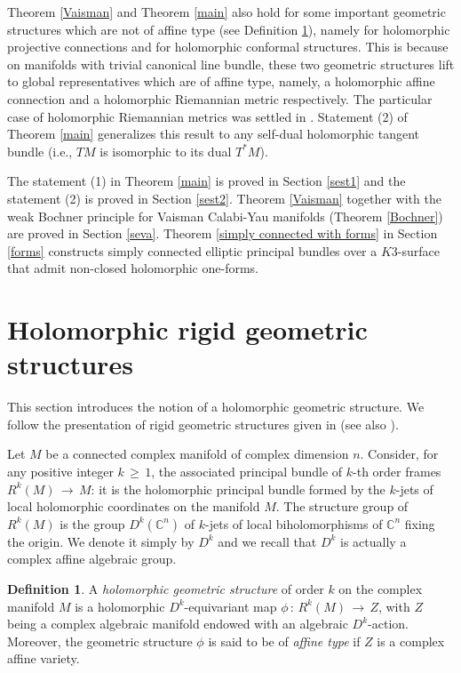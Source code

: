 \documentclass[12pt,reqno]{amsart}
\theoremstyle{definition}
\newtheorem{definition}[theorem]{Definition}
\numberwithin{equation}{section}
\begin{document}
Theorem \ref{Vaisman} and Theorem \ref{main} also hold for some important geometric structures which are 
not of affine type (see Definition \ref{def}), namely for holomorphic projective connections and for 
holomorphic conformal structures. This is because on manifolds with trivial canonical line bundle, these 
two geometric structures lift to global representatives which are of affine type, namely, a holomorphic 
affine connection and a holomorphic Riemannian metric respectively. The particular case of holomorphic 
Riemannian metrics was settled in \cite{BD3}. Statement (2) of Theorem \ref{main} generalizes this result 
to any self-dual holomorphic tangent bundle (i.e., $TM$ is isomorphic to its dual $T^*M$).

The statement (1) in Theorem \ref{main} is proved in Section \ref{sest1} and the statement (2) is proved in 
Section \ref{sest2}. Theorem \ref{Vaisman} together with the weak Bochner principle for Vaisman Calabi-Yau 
manifolds (Theorem \ref{Bochner}) are proved in Section \ref{seva}. Theorem \ref{simply connected with 
forms} in Section \ref{forms} constructs simply connected elliptic principal bundles over a $K3$-surface 
that admit non-closed holomorphic one-forms.

\section{Holomorphic rigid geometric structures}

This section introduces the notion of a holomorphic geometric structure. We follow the presentation of rigid 
geometric structures given in \cite{Gr} (see also \cite{Ben,DG}).

Let $M$ be a connected complex manifold of complex dimension $n$. Consider, for any positive integer $k 
\,\geq \,1$, the associated principal bundle of $k$-th order frames $R^k(M) \,\longrightarrow\, M$: it is 
the holomorphic principal bundle formed by the $k$-jets of local holomorphic coordinates on the manifold 
$M$. The structure group of $R^k(M)$ is the group $D^k ({\mathbb C}^n)$ of $k$-jets of local 
biholomorphisms of $\mathbb{C}^n$ fixing the origin. We denote it simply by $D^k$ and we recall that $D^k$ 
is actually a complex affine algebraic group.

\begin{definition}\label{def}
A {\it holomorphic geometric structure} of order $k$ on the complex manifold $M$ is a holomorphic
$D^k$-equivariant map $\phi\,:\, R^k(M)\, \longrightarrow\, Z$, with $Z$ being a complex
algebraic manifold endowed with an algebraic $D^k$-action. Moreover, the geometric
structure $\phi$ is said to be of {\it affine type} if $Z$ is a complex affine variety.
\end{definition}
\end{document}
